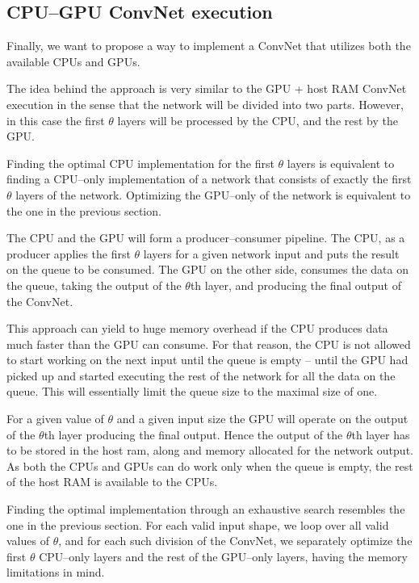 \documentclass[conference]{./IEEEtran/IEEEtran}
\begin{document}
\subsection{CPU--GPU ConvNet execution}

  Finally, we want to propose a way to implement a ConvNet that
  utilizes both the available CPUs and GPUs.

  The idea behind the approach is very similar to the GPU + host RAM
  ConvNet execution in the sense that the network will be divided into
  two parts.  However, in this case the first $\theta$ layers will be
  processed by the CPU, and the rest by the GPU.

  Finding the optimal CPU implementation for the first $\theta$ layers
  is equivalent to finding a CPU--only implementation of a network
  that consists of exactly the first $\theta$ layers of the network.
  Optimizing the GPU--only of the network is equivalent to the one in
  the previous section.

  The CPU and the GPU will form a producer--consumer pipeline.  The
  CPU, as a producer applies the first $\theta$ layers for a given
  network input and puts the result on the queue to be consumed.  The
  GPU on the other side, consumes the data on the queue, taking the
  output of the $\theta$th layer, and producing the final output of
  the ConvNet.

  This approach can yield to huge memory overhead if the CPU produces
  data much faster than the GPU can consume.  For that reason, the CPU
  is not allowed to start working on the next input until the queue is
  empty -- until the GPU had picked up and started executing the rest
  of the network for all the data on the queue.  This will essentially
  limit the queue size to the maximal size of one.

  For a given value of $\theta$ and a given input size the GPU will
  operate on the output of the $\theta$th layer producing the final
  output.  Hence the output of the $\theta$th layer has to be stored
  in the host ram, along and memory allocated for the network output.
  As both the CPUs and GPUs can do work only when the queue is empty,
  the rest of the host RAM is available to the CPUs.

  Finding the optimal implementation through an exhaustive search
  resembles the one in the previous section.  For each valid input
  shape, we loop over all valid values of $\theta$, and for each such
  division of the ConvNet, we separately optimize the first $\theta$
  CPU--only layers and the rest of the GPU--only layers, having the
  memory limitations in mind.
\end{document}
